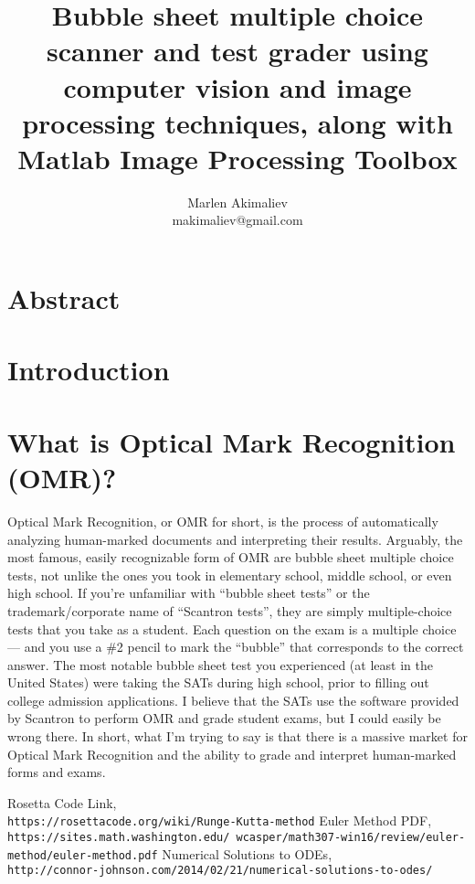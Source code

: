 \documentclass[a4paper,10pt]{article}
\title{Bubble sheet multiple choice scanner and test grader using computer vision and image processing techniques, along with Matlab\textsuperscript{\textregistered} Image Processing Toolbox}
\author{Marlen Akimaliev\\makimaliev@gmail.com}
\begin{document}
\maketitle
\section{Abstract}
\section{Introduction}
\section{What is Optical Mark Recognition (OMR)?}
Optical Mark Recognition, or OMR for short, is the process of automatically analyzing human-marked documents and interpreting their results. Arguably, the most famous, easily recognizable form of OMR are bubble sheet multiple choice tests, not unlike the ones you took in elementary school, middle school, or even high school. If you’re unfamiliar with “bubble sheet tests” or the trademark/corporate name of “Scantron tests”, they are simply multiple-choice tests that you take as a student. Each question on the exam is a multiple choice — and you use a \#2 pencil to mark the “bubble” that corresponds to the correct answer. 
The most notable bubble sheet test you experienced (at least in the United States) were taking the SATs during high school, prior to filling out college admission applications. I believe that the SATs use the software provided by Scantron to perform OMR and grade student exams, but I could easily be wrong there. In short, what I’m trying to say is that there is a massive market for Optical Mark Recognition and the ability to grade and interpret human-marked forms and exams.
\medskip
\begin{thebibliography}{9}
 Rosetta Code Link, \\\texttt{https://rosettacode.org/wiki/Runge-Kutta-method}
 Euler Method PDF, \\\texttt{https://sites.math.washington.edu/~wcasper/math307-win16/review/euler-method/euler-method.pdf}
 Numerical Solutions to ODEs, \\\texttt{http://connor-johnson.com/2014/02/21/numerical-solutions-to-odes/}
\end{thebibliography}
\end{document}

